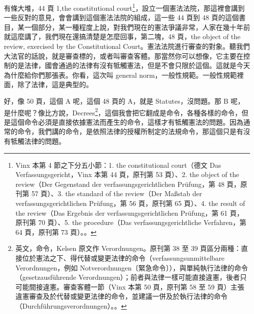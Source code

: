 \hypertarget{w05:cue:28}{}有條大堆，44 頁 1,the constitutional court\footnote{Vinx 本第 4 節之下分五小節：1. the constitutional court（德文 Das Verfassungsgericht，Vinx 本第 44 頁，原刊第 53 頁）、2. the object of the review（Der Gegenstand der verfassungsgerichtlichen Prüfung，第 48 頁，原刊第 57 頁）、3. the standard of the review（Der Maßstab der verfassungsgerichtlichen Prüfung，第 56 頁，原刊第 65 頁）、4. the result of the review（Das Ergebnis der verfassungsgerichtlichen Prüfung，第 61 頁，原刊第 70 頁）、5. the procedure（Das verfassungsgerichtliche Verfahren，第 64 頁，原刊第 73 頁）。\cite{kelsen2015}。}，設立一個憲法法院，那這裡會講到一些反對的意見，會會講到這個憲法法院的組成，這一些 44 頁到 48 頁的這個書目，某一個部分，某一種程度上說，對我們現在的憲法爭議非常，人家在幾十年前就這麼講了，我們現在還搞清楚是怎麼回事，第二塊，48 頁，the object of the review,
\hypertarget{w05:cue:29}{}exercised by the Constitutional Court。憲法法院進行審查的對象。聽我們大法官的話說，就是審查標的，或者叫審查客體。那當然你可以想像，它主要在控制的是法律，國會通過的法律有沒有牴觸憲法，但是不會只限於這個。這就是今天為什麼給你們那張表。你看，這次叫 general norm，一般性規範。一般性規範裡面，除了法律，這是典型的。

\hypertarget{w05:cue:30}{}好，像 50 頁，這個 A 呢，這個 48 頁的 A，就是 Statutes，沒問題。那 B 呢，是什麼呢？像比方說，Decrees\footnote{英文，命令，Kelsen 原文作 Verordnungen。原刊第 38 至 39 頁區分兩種：直接位於憲法之下、得代替或變更法律的命令（verfassungsunmittelbare Verordnungen，例如 Notverordnungen〔緊急命令〕），與單純執行法律的命令（gesetzausführende Verordnungen）；前者與法律一樣可能直接違憲，後者只可能間接違憲。審查客體一節（Vinx 本第 50 頁，原刊第 58 至 59 頁）主張違憲審查及於代替或變更法律的命令，並建議一併及於執行法律的命令（Durchführungsverordnungen）。\cite[38--39, 58--59]{kelsen1929}。}，這個我會把它翻成是命令，各種各樣的命令，但是這個命令必須是直接依據憲法而產生的命令，這樣才有牴觸憲法的問題。因為通常的命令，我們講的命令，是依照法律的授權所制定的法規命令，那這個只是有沒有牴觸法律的問題。

